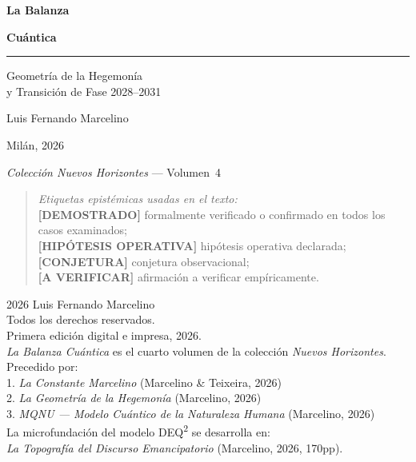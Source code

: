 \documentclass[12pt, twoside]{book}
\theoremstyle{plain}
\theoremstyle{definition}
\theoremstyle{remark}
\newcommand{\Proved}{\textnormal{\textbf{[DEMOSTRADO]}}}
\newcommand{\Hypoth}{\textnormal{\textbf{[HIP\'{O}TESIS OPERATIVA]}}}
\newcommand{\Conj}{\textnormal{\textbf{[CONJETURA]}}}
\newcommand{\ToVerify}{\textnormal{\textbf{[A VERIFICAR]}}}
\begin{document}
\begin{titlepage}
  \centering\vspace*{1.5cm}
  {\Huge\bfseries La Balanza\par}
  \vspace{0.2cm}
  {\Huge\bfseries Cu\'{a}ntica\par}
  \vspace{0.8cm}
  \rule{0.8\linewidth}{0.5pt}
  \vspace{0.6cm}

  {\large Geometr\'{i}a de la Hegemon\'{i}a\\[0.3cm]
   y Transici\'{o}n de Fase 2028--2031\par}
  \vspace{2cm}
  {\large Luis Fernando Marcelino\par}
  \vspace{0.5cm}
  {\normalsize Mil\'{a}n, 2026\par}
  \vfill
  {\small\textit{Colecci\'{o}n Nuevos Horizontes} --- Volumen~4\par}
  \vspace{0.5cm}
  \begin{small}\begin{quote}
    \textit{Etiquetas epist\'{e}micas usadas en el texto:}\\[2pt]
    \Proved{} formalmente verificado o confirmado en todos los casos examinados;\\
    \Hypoth{} hip\'{o}tesis operativa declarada;\\
    \Conj{} conjetura observacional;\\
    \ToVerify{} afirmaci\'{o}n a verificar emp\'{i}ricamente.
  \end{quote}\end{small}
\end{titlepage}

\thispagestyle{empty}
\vspace*{\fill}
\begin{small}
\noindent \textcopyright{} 2026 Luis Fernando Marcelino\\[4pt]
Todos los derechos reservados.\\[4pt]
Primera edici\'{o}n digital e impresa, 2026.\\[4pt]
\textit{La Balanza Cu\'{a}ntica} es el cuarto volumen de la colecci\'{o}n \textit{Nuevos Horizontes}.\\[4pt]
Precedido por:\\
1. \textit{La Constante Marcelino} (Marcelino \& Teixeira, 2026)\\
2. \textit{La Geometr\'{i}a de la Hegemon\'{i}a} (Marcelino, 2026)\\
3. \textit{MQNU --- Modelo Cu\'{a}ntico de la Naturaleza Humana} (Marcelino, 2026)\\[4pt]
La microfundaci\'{o}n del modelo DEQ\textsuperscript{2} se desarrolla en:\\
\textit{La Topograf\'{i}a del Discurso Emancipatorio} (Marcelino, 2026, 170pp).
\end{small}
\vspace*{\fill}
\clearpage
\end{document}
